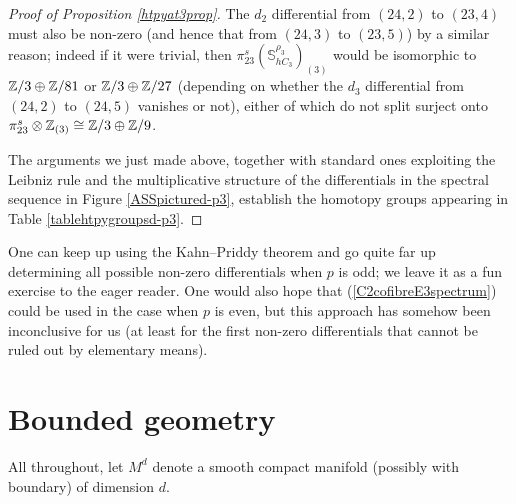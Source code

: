 \documentclass[a4paper, oneside]{amsart}
\newcommand{\1}{\mathds{1}}
\theoremstyle{remark}
\theoremstyle{definition}
\newcommand{\Z}{{\scaleobj{0.97}{\mathbb{Z}}}}
\newcommand{\s}{\mathbb{S}}
\numberwithin{equation}{section}
\begin{document}
\begin{proof}[Proof of Proposition \ref{htpyat3prop}]
The $d_2$ differential from $(24, 2)$ to $(23,4)$ must also be non-zero (and hence that from $(24,3)$ to $(23,5)$) by a similar reason; indeed if it were trivial, then $\pi_{23}^s(\s^{\rho_3}_{hC_3})_{(3)}$ would be isomorphic to $\Z/3\oplus \Z/81$ or $\Z/3\oplus \Z/27$ (depending on whether the $d_3$ differential from $(24,2)$ to $(24, 5)$ vanishes or not), either of which do not split surject onto $\pi_{23}^s\otimes \Z_{(3)}\cong\Z/3\oplus \Z/9$. 

The arguments we just made above, together with standard ones exploiting the Leibniz rule and the multiplicative structure of the differentials in the spectral sequence in Figure \ref{ASSpictured-p3}, establish the homotopy groups appearing in Table \ref{tablehtpygroupsd-p3}.
\end{proof}

One can keep up using the Kahn--Priddy theorem and go quite far up determining all possible non-zero differentials when $p$ is odd; we leave it as a fun exercise to the eager reader. One would also hope that (\ref{C2cofibreE3spectrum}) could be used in the case when $p$ is even, but this approach has somehow been inconclusive for us (at least for the first non-zero differentials that cannot be ruled out by elementary means).































\appendix

\section{Bounded geometry}\label{boundedappendix}
All throughout, let $M^d$ denote a smooth compact manifold (possibly with boundary) of dimension $d$.
\end{document}
